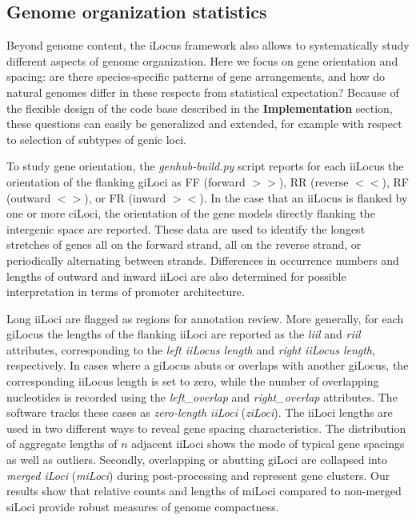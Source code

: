 \subsection{Genome organization statistics}
Beyond genome content, the iLocus framework also allows to systematically study different aspects of genome organization.
Here we focus on gene orientation and spacing: are there species-specific patterns of gene arrangements, and how do natural genomes differ in these respects from statistical expectation?
Because of the flexible design of the code base described in the \textbf{Implementation} section, these questions can easily be generalized and extended, for example with respect to selection of subtypes of genic loci.

To study gene orientation, the \textit{genhub-build.py} script reports for each iiLocus the orientation of the flanking giLoci as FF (forward $>>$), RR (reverse $<<$), RF (outward $<>$), or FR (inward $><$).
In the case that an iiLocus is flanked by one or more ciLoci, the orientation of the gene models directly flanking the intergenic space are reported.
These data are used to identify the longest stretches of genes all on the forward strand, all on the reverse strand, or periodically alternating between strands.
Differences in occurrence numbers and lengths of outward and inward iiLoci are also determined for possible interpretation in terms of promoter architecture.

Long iiLoci are flagged as regions for annotation review.
More generally, for each giLocus the lengths of the flanking iiLoci are reported as the \textit{liil} and \textit{riil} attributes, corresponding to the \textit{left iiLocus length} and \textit{right iiLocus length}, respectively.
In cases where a giLocus abuts or overlaps with another giLocus, the corresponding iiLocus length is set to zero, while the number of overlapping nucleotides is recorded using the \textit{left\_overlap} and \textit{right\_overlap} attributes.
The software tracks these cases as \textit{zero-length iiLoci} (\textit{ziLoci}).
The iiLoci lengths are used in two different ways to reveal gene spacing characteristics.
The distribution of aggregate lengths of $n$ adjacent iiLoci shows the mode of typical gene spacings as well as outliers.
Secondly, overlapping or abutting giLoci are collapsed into \textit{merged iLoci} (\textit{miLoci}) during post-processing and represent gene clusters.
Our results show that relative counts and lengths of miLoci compared to non-merged siLoci provide robust measures of genome compactness.

